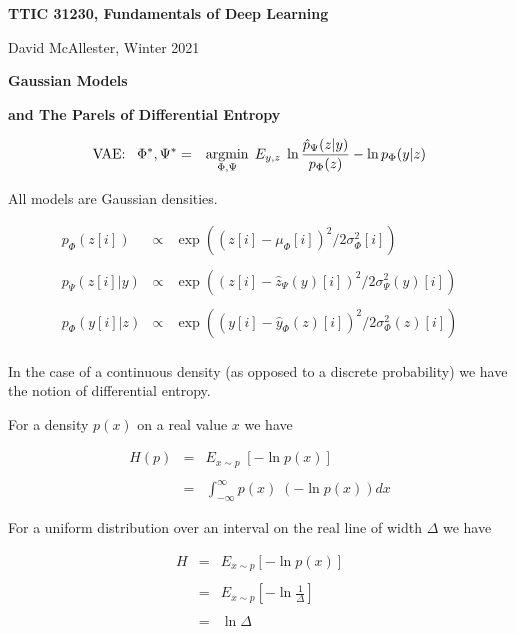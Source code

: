




{\Huge

  \centerline{\bf TTIC 31230, Fundamentals of Deep Learning}
  \bigskip
  \centerline{David McAllester, Winter 2021}
  \vfill
  \centerline{\bf Gaussian Models}
  \vfill
  \centerline{\bf and The Parels of Differential Entropy}
  \vfill
\vfill
\vfill


\vfill
\begin{eqnarray*}
\mbox{VAE:}\;\;\;\Phi^*,\Psi^* &  = & \operatorname*{argmin}_{\Phi,\Psi}\;E_{y,z}  \;\ln \frac{\hat{p}_\Psi(z|y)}{p_\Phi(z)}  - \ln p_\Phi(y|z) \\
\end{eqnarray*}

\vfill
All models are Gaussian densities.

\vfill
{\huge 
\begin{eqnarray*}
p_\Phi(z[i]) & \propto & \exp((z[i]-\mu_\Phi[i])^2/2\sigma^2_\Phi[i])\\
\\
p_\Psi(z[i]|y) & \propto & \exp((z[i]-\hat{z}_\Psi(y)[i])^2/2\sigma^2_\Psi(y)[i])\\
\\
p_\Phi(y[i]|z) & \propto & \exp((y[i]-\hat{y}_\Phi(z)[i])^2/2\sigma_\Phi^2(z)[i])\\
\end{eqnarray*}
}


In the case of a continuous density (as opposed to a discrete probability) we have the notion of differential entropy.

\vfill
For a density $p(x)$ on a real value $x$ we have

\vfill
\begin{eqnarray*}
H(p) & = & E_{x \sim p}\;\left[-\ln p(x)\right] \\
\\
& = &\int_{-\infty}^\infty p(x) \;(-\ln p(x)) dx
\end{eqnarray*}


For a uniform distribution over an interval on the real line of width $\Delta$ we have

\begin{eqnarray*}
H & = & E_{x \sim p} \left[-\ln p(x)\right] \\
\\
& = & E_{x \sim p} \left[-\ln \frac{1}{\Delta}\right] \\
\\
& = & \ln \Delta
\end{eqnarray*}

}
